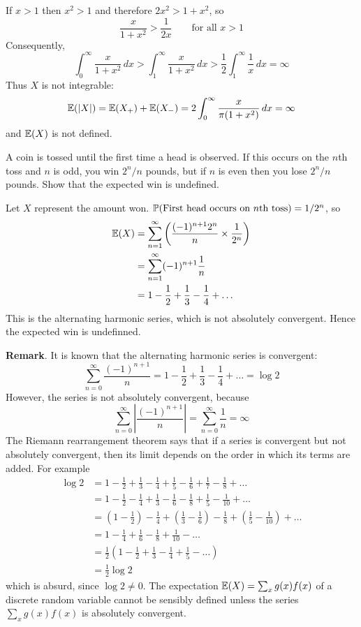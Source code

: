 \begin{exercise}
\begin{questions}
\begin{answer}
If $x>1$ then $x^2 > 1$ and therefore $2x^2 > 1+x^2$, so
\[
\frac{x}{1+x^2} > \frac{1}{2x} \qquad\text{for all } x > 1
\]
Consequently,
\[
\int_{0}^{\infty}\frac{x}{1+x^2}\,dx
	> \int_{1}^{\infty}\frac{x}{1+x^2}\,dx
	> \frac{1}{2}\int_{1}^{\infty}\frac{1}{x}\,dx
	= \infty
\]
Thus $X$ is not integrable:
\[
\mathbb{E}(|X|) = \mathbb{E}(X_{+}) + \mathbb{E}(X_{-}) = 2\int_0^\infty \frac{x}{\pi(1+x^2)}\,dx = \infty
\]
and $\mathbb{E}(X)$ is not defined.
\end{answer}


\question
A coin is tossed until the first time a head is observed. If this occurs on the $n$th toss and $n$ is odd, you win $2^n/n$ pounds, but if $n$ is even then you lose $2^n/n$ pounds. Show that the expected win is undefined.
\begin{answer}
Let $X$ represent the amount won.
$\mathbb{P}(\text{First head occurs on $n$th toss}) = 1/2^n$, so
\begin{align*}
\mathbb{E}(X)
	& = \sum_{n=1}^{\infty} \left(\frac{(-1)^{n+1}2^n}{n} \times \frac{1}{2^n}\right) \\
	& = \sum_{n=1}^{\infty} (-1)^{n+1} \frac{1}{n} \\
	& = 1 - \frac{1}{2} + \frac{1}{3} - \frac{1}{4} + \ldots \\
\end{align*}
This is the alternating harmonic series, which is not absolutely convergent. Hence the expected win is undefinned.

\textbf{Remark}. It is known that the alternating harmonic series is convergent:
\[
\sum_{n=0}^{\infty} \frac{(-1)^{n+1}}{n} = 1 - \frac{1}{2} + \frac{1}{3} - \frac{1}{4} + \ldots = \log 2
\]
However, the series is not absolutely convergent, because
\[
\sum_{n=0}^{\infty} \left|\frac{(-1)^{n+1}}{n}\right| 
	= \sum_{n=0}^{\infty}\frac{1}{n} = \infty 
\]
The Riemann rearrangement theorem says that if a series is convergent but not absolutely convergent, then its limit depends on the order in which its terms are added. For example
\begin{align*}
\log 2
	& = 1 - \frac{1}{2} + \frac{1}{3} - \frac{1}{4} + \frac{1}{5} - \frac{1}{6} + \frac{1}{7} - \frac{1}{8} + \ldots \\
	& = 1 - \frac{1}{2} - \frac{1}{4} + \frac{1}{3} - \frac{1}{6} - \frac{1}{8} + \frac{1}{5} - \frac{1}{10} + \ldots \\
	& = \left(1 - \frac{1}{2}\right) - \frac{1}{4} + \left(\frac{1}{3} - \frac{1}{6}\right)
			 - \frac{1}{8} + \left(\frac{1}{5} - \frac{1}{10}\right) + \ldots \\
	& = 1 - \frac{1}{4} + \frac{1}{6} - \frac{1}{8} + \frac{1}{10} - \ldots \\
	& = \frac{1}{2}\left(1 - \frac{1}{2} + \frac{1}{3} - \frac{1}{4} + \frac{1}{5} - \ldots \right)\\
	& = \frac{1}{2}\log 2	
\end{align*}
which is absurd, since $\log 2 \neq 0$.	The expectation $\mathbb{E}(X)=\sum_x g(x)f(x)$ of a discrete random variable cannot be sensibly defined unless the series $\sum_x g(x)f(x)$ is absolutely convergent.
 

\end{answer}
\end{questions}
\end{exercise}
